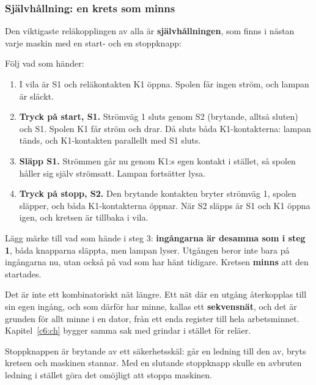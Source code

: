 \subsubsection{Självhållning: en krets som minns}
Den viktigaste reläkopplingen av alla är \textbf{självhållningen}, som finns i nästan varje maskin
med en start- och en stoppknapp:


\noindent Följ vad som händer:
\begin{enumerate}
  \item I vila är S1 och reläkontakten K1 öppna. Spolen får ingen ström, och lampan är släckt.
  \item \textbf{Tryck på start, S1.} Strömväg 1 sluts genom S2 (brytande, alltså sluten) och S1.
    Spolen K1 får ström och drar. Då sluts båda K1-kontakterna: lampan tänds, och K1-kontakten
    parallellt med S1 sluts.
  \item \textbf{Släpp S1.} Strömmen går nu genom K1:s egen kontakt i stället, så spolen håller sig
    själv strömsatt. Lampan fortsätter lysa.
  \item \textbf{Tryck på stopp, S2.} Den brytande kontakten bryter strömväg 1, spolen släpper, och
    båda K1-kontakterna öppnar. När S2 släpps är S1 och K1 öppna igen, och kretsen är tillbaka i
    vila.
\end{enumerate}

Lägg märke till vad som hände i steg 3: \textbf{ingångarna är desamma som i steg 1}, båda knapparna
släppta, men lampan lyser. Utgången beror inte bara på ingångarna nu, utan också på vad som har
hänt tidigare. Kretsen \textbf{minns} att den startades.

Det är inte ett kombinatoriskt nät längre. Ett nät där en utgång återkopplas till sin egen ingång,
och som därför har minne, kallas ett \textbf{sekvensnät}, och det är grunden för allt minne i en
dator, från ett enda register till hela arbetsminnet. Kapitel~\ref{c6:ch} bygger samma sak med
grindar i stället för reläer.

Stoppknappen är brytande av ett säkerhetsskäl: går en ledning till den av, bryts kretsen och
maskinen stannar. Med en slutande stoppknapp skulle en avbruten ledning i stället göra det omöjligt
att stoppa maskinen.

